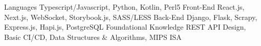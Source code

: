 
\begin{cvskills}
  \cvskill
    {Languages} %
    {Typescript/Javascript, Python, Kotlin, Perl5} %
  \cvskill
    {Front-End}
    {React.js, Next.js, WebSocket, Storybook.js, SASS/LESS}
  \cvskill
    {Back-End} %
    {Django, Flask, Scrapy, Express.js, Hapi.js, PostgreSQL} %
  \cvskill
    {Foundational Knowledge}
    {REST API Design, Basic CI/CD, Data Structures \& Algorithms, MIPS ISA}
\end{cvskills}
